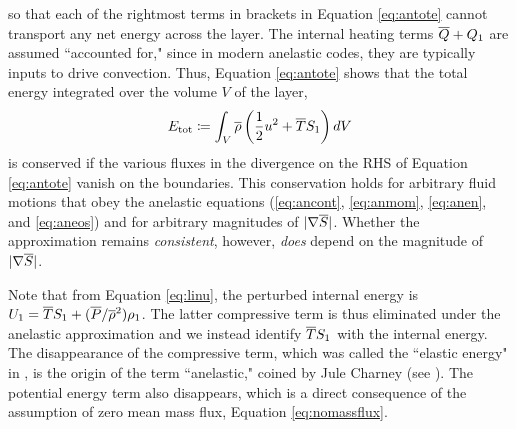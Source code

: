 \documentclass[12pt]{article}
\begin{document}
so that each of the rightmost terms in brackets in Equation \eqref{eq:antote} cannot transport any net energy across the layer. The internal heating terms $\overline{Q} + Q_1$ are assumed ``accounted for," since in modern anelastic codes, they are typically inputs to drive convection. Thus, Equation \eqref{eq:antote} shows that the total energy integrated over the volume $V$ of the layer,
\begin{align}
	E_{\rm tot} \coloneqq \int_V \overline{\rho}\left(\frac{1}{2} u^2 + \overline{T} S_1\right) dV
\end{align}
is conserved if the various fluxes in the divergence on the RHS of Equation \eqref{eq:antote} vanish on the boundaries. This conservation holds for arbitrary fluid motions that obey the anelastic equations (\eqref{eq:ancont}, \eqref{eq:anmom}, \eqref{eq:anen}, and \eqref{eq:aneos}) and for arbitrary magnitudes of $|\nabla \overline{S}|$. Whether the approximation remains \textit{consistent}, however, \textit{does} depend on the magnitude of $|\nabla\overline{S}|$.

Note that from Equation \eqref{eq:linu}, the perturbed internal energy is $U_1 = \overline{T} S_1 + (\overline{P}/\overline{\rho}^2)\rho_1$. The latter compressive term is thus eliminated under the anelastic approximation and we instead identify $\overline{T} S_1$ with the internal energy. The disappearance of the compressive term, which was called the ``elastic energy" in \citet{Eckart1956}, is the origin of the term ``anelastic," coined by Jule Charney (see \citealt{Ogura1962}). The potential energy term also disappears, which is a direct consequence of the assumption of zero mean mass flux, Equation \eqref{eq:nomassflux}. 
\end{document}
